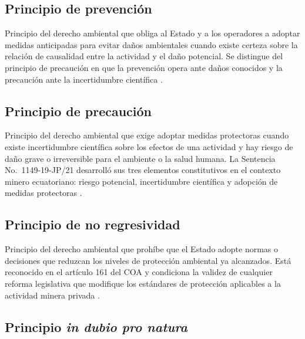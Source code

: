 \subsection{Principio de prevención}

Principio del derecho ambiental que obliga al Estado y a los operadores a adoptar medidas anticipadas para evitar daños ambientales cuando existe certeza sobre la relación de causalidad entre la actividad y el daño potencial. Se distingue del principio de precaución en que la prevención opera ante daños conocidos y la precaución ante la incertidumbre científica \parencite{coa_2017}.

\subsection{Principio de precaución}

Principio del derecho ambiental que exige adoptar medidas protectoras cuando existe incertidumbre científica sobre los efectos de una actividad y hay riesgo de daño grave o irreversible para el ambiente o la salud humana. La Sentencia No.\ 1149-19-JP/21 desarrolló sus tres elementos constitutivos en el contexto minero ecuatoriano: riesgo potencial, incertidumbre científica y adopción de medidas protectoras \parencite{cce_1149_19_jp_21,coa_2017}.

\subsection{Principio de no regresividad}

Principio del derecho ambiental que prohíbe que el Estado adopte normas o decisiones que reduzcan los niveles de protección ambiental ya alcanzados. Está reconocido en el artículo 161 del COA y condiciona la validez de cualquier reforma legislativa que modifique los estándares de protección aplicables a la actividad minera privada \parencite{coa_2017}.

\subsection{Principio \textit{in dubio pro natura}}

